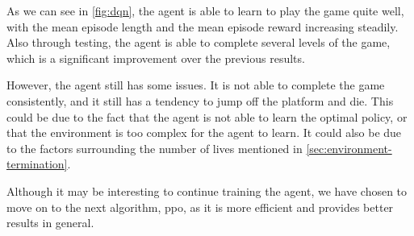As we can see in \cref{fig:dqn}, the agent is able to learn to play the game
quite well, with the mean episode length and the mean episode reward increasing 
steadily. Also through testing, the agent is able to complete several levels
of the game, which is a significant improvement over the previous results.

However, the agent still has some issues. It is not able to complete the game
consistently, and it still has a tendency to jump off the platform and die.
This could be due to the fact that the agent is not able to learn the optimal
policy, or that the environment is too complex for the agent to learn. It could
also be due to the factors surrounding the number of lives mentioned in
\cref{sec:environment-termination}.

Although it may be interesting to continue training the agent, we have chosen
to move on to the next algorithm, \gls{ppo}, as it is more efficient and
provides better results in general.